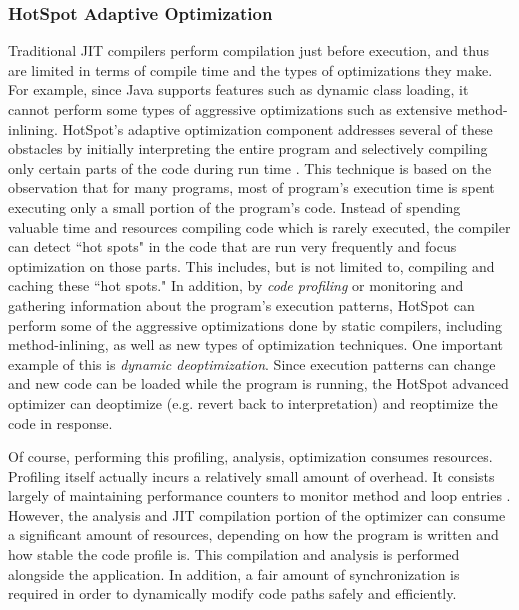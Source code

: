 \documentclass{sig-alternate}
\begin{document}
\subsubsection{HotSpot Adaptive Optimization}
Traditional JIT compilers perform compilation just before execution, and thus are limited in terms of compile time and the types of optimizations they make. For example, since Java supports features such as dynamic class loading, it cannot perform some types of aggressive optimizations such as extensive method-inlining. HotSpot's adaptive optimization component addresses several of these obstacles by initially interpreting the entire program and selectively compiling only certain parts of the code during run time \cite{hotspot:whitepaper}. This technique is based on the observation that for many programs, most of program's execution time is spent executing only a small portion of the program's code. Instead of spending valuable time and resources compiling code which is rarely executed, the compiler can detect ``hot spots" in the code that are run very frequently and focus optimization on those parts. This includes, but is not limited to, compiling and caching these ``hot spots." In addition, by \textit{code profiling} or monitoring and gathering information about the program's execution patterns, HotSpot can perform some of the aggressive optimizations done by static compilers, including method-inlining, as well as new types of optimization techniques. One important example of this is \textit{dynamic deoptimization}. Since execution patterns can change and new code can be loaded while the program is running, the HotSpot advanced optimizer can deoptimize (e.g. revert back to interpretation) and reoptimize the code in response.

Of course, performing this profiling, analysis, optimization consumes resources. Profiling itself actually incurs a relatively small amount of overhead. It consists largely of maintaining performance counters to monitor method and loop entries \cite{hohensee:overview}. However, the analysis and JIT compilation portion of the optimizer can consume a significant amount of resources, depending on how the program is written and how stable the code profile is. This compilation and analysis is performed alongside the application. In addition, a fair amount of synchronization is required in order to dynamically modify code paths safely and efficiently.
\end{document}
